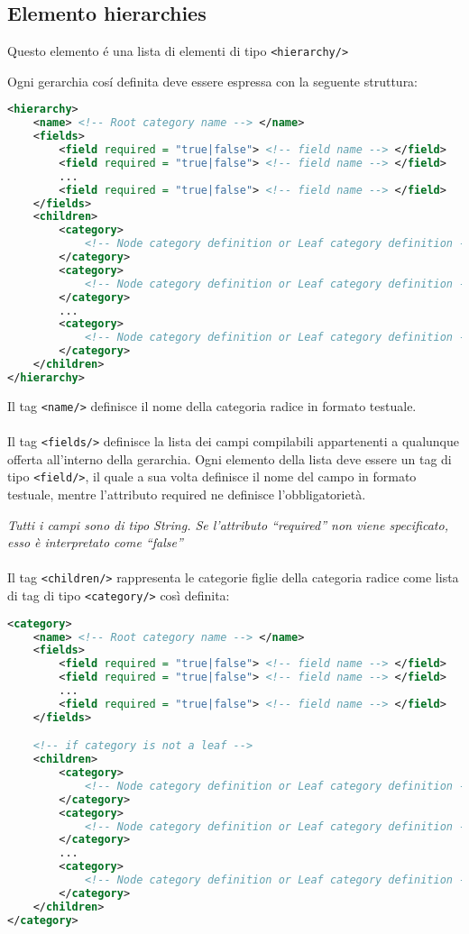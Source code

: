 \pagebreak

\subsection{Elemento hierarchies}
Questo elemento é una lista di elementi di tipo \verb|<hierarchy/>|

Ogni gerarchia cosí definita deve essere espressa con la seguente struttura:

\begin{lstlisting}[language=XML]
<hierarchy>
    <name> <!-- Root category name --> </name>
    <fields>
        <field required = "true|false"> <!-- field name --> </field>
        <field required = "true|false"> <!-- field name --> </field>
        ...
        <field required = "true|false"> <!-- field name --> </field>
    </fields>
    <children>
        <category>
            <!-- Node category definition or Leaf category definition -->
        </category>
        <category>
            <!-- Node category definition or Leaf category definition -->
        </category>
        ...
        <category>
            <!-- Node category definition or Leaf category definition -->
        </category>
    </children>
</hierarchy>
\end{lstlisting}

Il tag \verb|<name/>| definisce il nome della categoria radice in formato testuale.
\\\\
Il tag \verb|<fields/>| definisce la lista dei campi compilabili appartenenti a qualunque offerta all'interno della gerarchia.
Ogni elemento della lista deve essere un tag di tipo \verb|<field/>|, il quale a sua volta definisce il nome del campo in formato testuale, mentre l'attributo required ne definisce l'obbligatorietà.

\textit{Tutti i campi sono di tipo String. Se l'attributo ``required'' non viene specificato, esso è interpretato come ``false''}
\\\\
Il tag \verb|<children/>| rappresenta le categorie figlie della categoria radice come lista di tag di tipo \verb|<category/>| così definita:

\begin{lstlisting}[language=XML]
<category>
    <name> <!-- Root category name --> </name>
    <fields>
        <field required = "true|false"> <!-- field name --> </field>
        <field required = "true|false"> <!-- field name --> </field>
        ...
        <field required = "true|false"> <!-- field name --> </field>
    </fields>

    <!-- if category is not a leaf -->
    <children>
        <category>
            <!-- Node category definition or Leaf category definition -->
        </category>
        <category>
            <!-- Node category definition or Leaf category definition -->
        </category>
        ...
        <category>
            <!-- Node category definition or Leaf category definition -->
        </category>
    </children>
</category>
\end{lstlisting}
    

